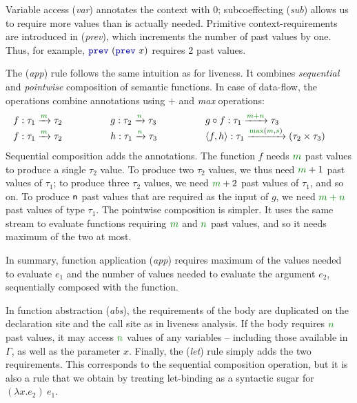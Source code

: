 Variable access (\emph{var}) annotates the context with $0$; subcoeffecting (\emph{sub}) allows
us to require more values than is actually needed. Primitive context-requirements are introduced
in (\emph{prev}), which increments the number of past values by one. Thus, for example,
$\kvd{prev}~(\kvd{prev}~x)$ requires 2 past values.

The (\emph{app}) rule follows the same intuition as for liveness. It combines \emph{sequential}
and \emph{pointwise} composition of semantic functions. In case of data-flow, the operations
combine annotations using $+$ and \emph{max} operations:
%
\begin{equation*}
\begin{array}{lll}
f : \tau_1 \xrightarrow{\cclrd{m}} \tau_2 \qquad\qquad&
g : \tau_2 \xrightarrow{\cclrd{n}} \tau_3 \qquad\qquad&
g \circ f : \tau_1 \xrightarrow{\cclrd{m+n}} \tau_3 \qquad\qquad
\\
f : \tau_1 \xrightarrow{\cclrd{m}} \tau_2 \qquad\qquad&
h : \tau_1 \xrightarrow{\cclrd{n}} \tau_3 \qquad\qquad&
\langle f, h \rangle : \tau_1 \xrightarrow{\cclrd{\textnormal{max}}(\cclrd{m}, \cclrd{s})} (\tau_2 \times \tau_3) \qquad
\end{array}
\end{equation*}
%
Sequential composition adds the annotations. The function $f$ needs $\cclrd{m}$ past values to
produce a single $\tau_2$ value. To produce two $\tau_2$ values, we thus need $\cclrd{m}+1$ past
values of $\tau_1$; to produce three $\tau_2$ values, we need $\cclrd{m}+2$ past values of $\tau_1$,
and so on. To produce $\textnormal{\sffamily n}$ past values that are required as the input of $g$, we need
$\cclrd{m+n}$ past values of type $\tau_1$. The pointwise composition is simpler. It uses
the same stream to evaluate functions requiring $\cclrd{m}$ and $\cclrd{n}$ past values, and so it
needs maximum of the two at most.

In summary, function application (\emph{app}) requires maximum of the values needed to evaluate
$e_1$ and the number of values needed to evaluate the argument $e_2$, sequentially composed with
the function.

In function abstraction (\emph{abs}), the requirements of the body are duplicated on the declaration site
and the call site as in liveness analysis. If the body requires $\cclrd{n}$ past values, it may access
$\cclrd{n}$ values of any variables -- including those available in $\Gamma$, as well as the parameter
$x$. Finally, the (\emph{let}) rule simply adds the two requirements. This corresponds to the sequential
composition operation, but it is also a rule that we obtain by treating let-binding as a syntactic
sugar for $(\lambda x.e_2)~e_1$.

